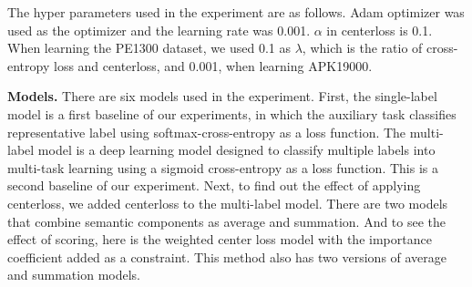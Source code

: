 The hyper parameters used in the experiment are as follows. Adam optimizer \cite{kingma2014adam} was used as the optimizer and the learning rate was 0.001. $\alpha$ in centerloss is 0.1. When learning the PE1300 dataset, we used 0.1 as $\lambda$, which is the ratio of cross-entropy loss and centerloss, and 0.001, when learning APK19000. 


\textbf{Models. }
There are six models used in the experiment. First, the single-label model is a first baseline of our experiments, in which the auxiliary task classifies representative label using softmax-cross-entropy as a loss function. The multi-label model is a deep learning model designed to classify multiple labels into multi-task learning using a sigmoid cross-entropy as a loss function. This is a second baseline of our experiment. Next, to find out the effect of applying centerloss, we added centerloss to the multi-label model. There are two models that combine semantic components as average and summation. And to see the effect of scoring, here is the weighted center loss model with the importance coefficient added as a constraint. This method also has two versions of average and summation models.
  

